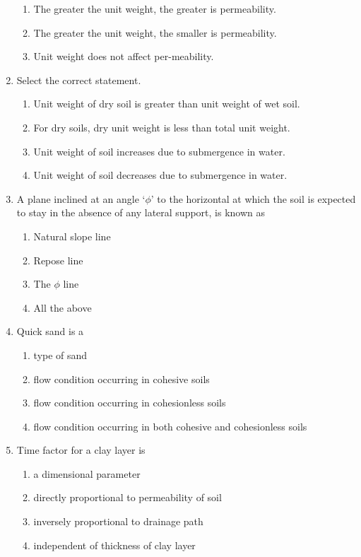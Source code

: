 \documentclass[11pt,a4paper]{article}
\begin{document}
\begin{enumerate}
\begin{enumerate}[label=\Alph*.]
\item{The greater the unit weight, the greater is permeability.}
\item{The greater the unit weight, the smaller is permeability.}
\item{Unit weight does not affect per-meability.}
\end{enumerate}
\item{Select the correct statement.}
\begin{enumerate}[label=\Alph*.]
\item{Unit weight of dry soil is greater than unit weight of wet soil.}
\item{For dry soils, dry unit weight is less than total unit weight.}
\item{Unit weight of soil increases due to submergence in water.}
\item{Unit weight of soil decreases due to submergence in water.}
\end{enumerate}
\item{A plane inclined at an angle `$\phi$' to the horizontal at which the soil is expected to stay in the absence of any lateral support, is known as
}
\begin{enumerate}[label=\Alph*.]
\item{Natural slope line}
\item{Repose line}
\item{The $\phi$ line}
\item{All the above}
\end{enumerate}
\item{Quick sand is a}
\begin{enumerate}[label=\Alph*.]
\item{type of sand}
\item{flow condition occurring in cohesive soils}
\item{flow condition occurring in cohesionless soils}
\item{flow condition occurring in both cohesive and cohesionless soils}
\end{enumerate}
\item{Time factor for a clay layer is}
\begin{enumerate}[label=\Alph*.]
\item{a dimensional parameter}
\item{directly proportional to permeability of soil}
\item{inversely proportional to drainage path}
\item{independent of thickness of clay layer}

\end{enumerate}
\end{enumerate}
\end{document}
